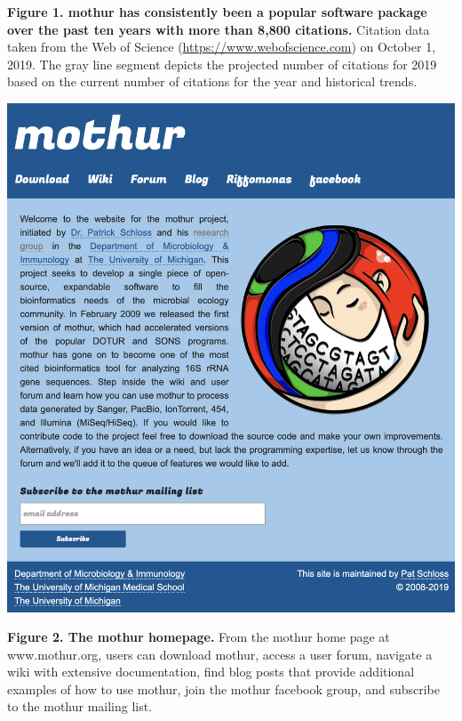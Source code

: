 \documentclass[11pt,]{article}
\begin{document}
\textbf{Figure 1. mothur has consistently been a popular software
package over the past ten years with more than 8,800 citations.}
Citation data taken from the Web of Science
(\url{https://www.webofscience.com}) on October 1, 2019. The gray line
segment depicts the projected number of citations for 2019 based on the
current number of citations for the year and historical trends.

\newpage

\includegraphics{figure_2.png}

\textbf{Figure 2. The mothur homepage.} From the mothur home page at
www.mothur.org, users can download mothur, access a user forum, navigate
a wiki with extensive documentation, find blog posts that provide
additional examples of how to use mothur, join the mothur facebook
group, and subscribe to the mothur mailing list.

\newpage
\end{document}
